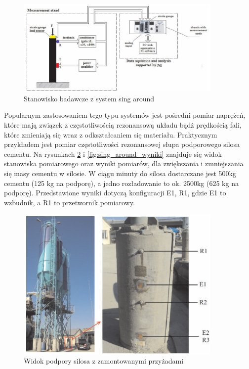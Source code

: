 \begin{figure}[h]
\centering
\includegraphics[width=10cm]{Zdjecia/2/sing_around}
\caption{Stanowisko badawcze z system sing around}
\label{fig:sing_around}
\end{figure}

Popularnym zastosowaniem tego typu systemów jest pośredni pomiar naprężeń, które mają związek z częstotliwością rezonansową układu bądź prędkością fali, które zmieniają się wraz z odkształcaniem się materiału. Praktycznym przykładem jest pomiar częstotliwości rezonansowej słupa podporowego silosa cementu. Na rysunkach \ref{fig:sing_around_silos} i \ref{fig:sing_around_wyniki} znajduje się widok stanowiska pomiarowego oraz wyniki pomiarów, dla zwiększania i zmniejszania się masy cementu w silosie. W ciągu minuty do silosa dostarczane jest 500kg cementu (125 kg na podporę), a jedno rozładowanie to ok. 2500kg (625 kg na podporę). Przedstawione wyniki dotyczą konfiguracji E1, R1, gdzie E1 to wzbudnik, a R1 to przetwornik pomiarowy.

\begin{figure}[h]
\centering
\includegraphics[width=10cm]{Zdjecia/2/sing_around_silos}
\caption{Widok podpory silosa z zamontowanymi przyżadami}
\label{fig:sing_around_silos}
\end{figure}

